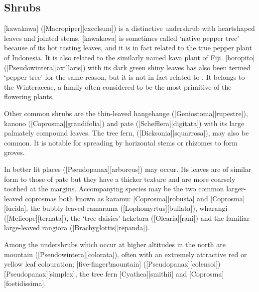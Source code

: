 \subsection{Shrubs}

[kawakawa] ([Macropiper][excelsum]) is a distinctive undershrub with heartshaped leaves and jointed stems.
[kawakawa] is sometimes called `native pepper tree' because of its hot tasting leaves, and it is in fact related to the true pepper plant of Indonesia.
It is also related to the similarly named kava plant of Fiji.
[horopito] ([Pseudowintera][axillaris]) with its dark green shiny leaves has also been termed `pepper tree' for the same reason, but it is not in fact related to .
It belongs to the Winteraceae, a family often considered to be the most primitive of the flowering plants.

Other common shrubs are the thin-leaved hangehange ([Geniostoma][rupestre]), kanono ([Coprosma][grandifolia]) and pate ([Schefflera][digitata]) with its large palmately compound leaves.
The tree fern,  ([Dicksonia][squarrosa]), may also be common.
It is notable for spreading by horizontal stems or rhizomes to form groves.

In better lit places  ([Pseudopanax][arboreus]) may occur.
Its leaves are of similar form to those of pate but they have a thicker texture and are more coarsely toothed at the margins.
Accompanying species may be the two common larger-leaved coprosmas both known as karamu: [Coprosma][robusta] and [Coprosma][lucida], the bubbly-leaved ramarama ([Lophomyrtus][bullata]), wharangi ([Melicope][ternata]), the `tree daisies' heketara ([Olearia][rani]) and the familiar large-leaved rangiora ([Brachyglottis][repanda]).

Among the undershrubs which occur at higher altitudes in the north are mountain  ([Pseudowintera][colorata]), often with an extremely attractive red or yellow leaf colouration; [five-finger!mountain] ([Pseudopanax][colensoi]) [Pseudopanax][simplex], the tree fern [Cyathea][smithii] and [Coprosma][foetidissima].

